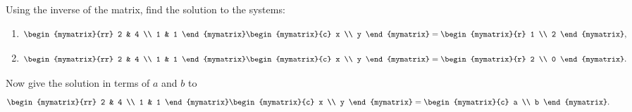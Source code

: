 \begin{ex}
  Using the inverse of the matrix, find the solution to the systems:
  \begin{enumerate}
  \item
    \begin{equation*}
      \begin{mymatrix}{rr}
        2 & 4  \\
        1 & 1
      \end{mymatrix}
      \begin{mymatrix}{c}
        x \\
        y
      \end{mymatrix} =\begin{mymatrix}{r}
        1 \\
        2
      \end{mymatrix},
    \end{equation*}
  \item
    \begin{equation*}
      \begin{mymatrix}{rr}
        2 & 4 \\
        1 & 1
      \end{mymatrix} \begin{mymatrix}{c}
        x \\
        y
      \end{mymatrix} =\begin{mymatrix}{r}
        2 \\
        0
      \end{mymatrix}.
    \end{equation*}
  \end{enumerate}
  Now give the solution in terms of $a$ and $b$ to
  \begin{equation*}
    \begin{mymatrix}{rr}
      2 & 4 \\
      1 & 1
    \end{mymatrix}
    \begin{mymatrix}{c}
      x \\
      y
    \end{mymatrix}
    =
    \begin{mymatrix}{c}
      a \\
      b
    \end{mymatrix}.
  \end{equation*}
\end{ex}

